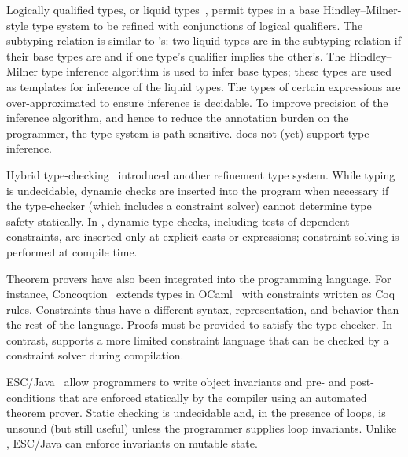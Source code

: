 
Logically qualified types, or liquid types~\cite{liquid-types},
permit types in a base Hindley--Milner-style type system to be refined with
conjunctions of logical qualifiers.  The subtyping relation is similar to
\Xten{}'s: two liquid types are in the subtyping relation if their base
types are and if one type's qualifier implies the other's.
The Hindley--Milner type
inference algorithm is used to infer base types; these types are used as templates for inference of the liquid types.
The types of certain expressions are over-approximated to ensure inference
is decidable.
To improve precision of the inference algorithm, and hence
to reduce the annotation burden on the programmer, 
the type system is path sensitive.  \Xten{} does not (yet) support type
inference.

Hybrid type-checking~\cite{flanagan-popl06,flanagan-fool06}
introduced another refinement type system.
While typing is undecidable, dynamic checks are inserted into
the program when necessary if the type-checker (which
includes a constraint solver) cannot determine
type safety statically.
In \Xten{}, dynamic type checks, including tests of dependent
constraints, are inserted only at explicit casts or
 expressions; constraint solving is performed at compile time.


Theorem provers have also been integrated into the programming language.
For instance,
Concoqtion~\cite{concoqtion} extends types in OCaml~\cite{ocaml}
with constraints written as Coq~\cite{coq} rules.
Constraints thus have a different
syntax, representation, and behavior than the rest of the language.
Proofs must be provided to satisfy the type checker.
In contrast, 
\Xten{} supports a more limited constraint language 
that can be checked by a
constraint solver during compilation.

ESC/Java~\cite{esc-java}
allow programmers to write object invariants and pre- and
post-conditions that are enforced statically
by the compiler using an automated theorem prover.
Static checking is undecidable and, in the presence of loops,
is unsound (but still useful) unless the programmer supplies loop invariants.
Unlike \Xten{},
ESC/Java can enforce invariants on mutable state.

